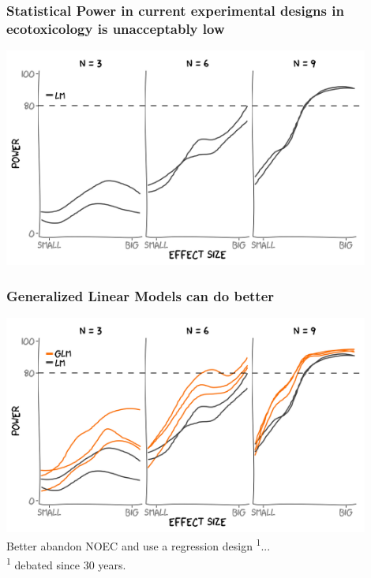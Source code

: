 \documentclass[12pt
, t
]{beamer}
\begin{document}
\begin{frame}
\end{frame}


\begin{frame}
	\frametitle{Statistical Power in current experimental designs in ecotoxicology is unacceptably low}
	\center
	\includegraphics[width = 0.9\textwidth]{fig/glm2.png} \\
\end{frame}


\begin{frame}
\frametitle{Generalized Linear Models can do better}
	\center
	\includegraphics[width = 0.9\textwidth]{fig/glm1.png} \\
	\pause
	\center
	Better abandon NOEC and use a regression design \textsuperscript{1}...\\
	\tiny \textsuperscript{1} debated since 30 years.
\end{frame}
\end{document}
